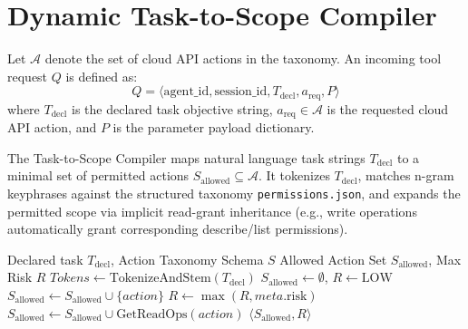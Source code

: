 \documentclass[conference]{IEEEtran}
\begin{document}
\section{Dynamic Task-to-Scope Compiler}\label{sec:compiler}

Let $\mathcal{A}$ denote the set of cloud API actions in the taxonomy. An incoming tool request $Q$ is defined as:
\begin{equation}
Q = \langle \text{agent\_id}, \text{session\_id}, T_{\text{decl}}, a_{\text{req}}, P \rangle
\end{equation}
where $T_{\text{decl}}$ is the declared task objective string, $a_{\text{req}} \in \mathcal{A}$ is the requested cloud API action, and $P$ is the parameter payload dictionary.

The Task-to-Scope Compiler maps natural language task strings $T_{\text{decl}}$ to a minimal set of permitted actions $S_{\text{allowed}} \subseteq \mathcal{A}$. It tokenizes $T_{\text{decl}}$, matches n-gram keyphrases against the structured taxonomy \texttt{permissions.json}, and expands the permitted scope via implicit read-grant inheritance (e.g., write operations automatically grant corresponding describe/list permissions).

\begin{algorithm}[t]
\caption{Task-to-Scope Permission Compilation}
\label{alg:compiler}
\begin{algorithmic}[1]
\REQUIRE Declared task $T_{\text{decl}}$, Action Taxonomy Schema $S$
\ENSURE Allowed Action Set $S_{\text{allowed}}$, Max Risk $R$
\STATE $Tokens \leftarrow \text{TokenizeAndStem}(T_{\text{decl}})$
\STATE $S_{\text{allowed}} \leftarrow \emptyset$, $R \leftarrow \text{LOW}$
                \STATE $S_{\text{allowed}} \leftarrow S_{\text{allowed}} \cup \{action\}$
                \STATE $R \leftarrow \max(R, meta.\text{risk})$
            \ENDIF
        \ENDFOR
    \ENDFOR
\ENDFOR
{}
            \STATE $S_{\text{allowed}} \leftarrow S_{\text{allowed}} \cup \text{GetReadOps}(action)$
        \ENDIF
    \ENDFOR
\ENDIF
\RETURN $\langle S_{\text{allowed}}, R \rangle$
\end{algorithmic}
\end{algorithm}
\end{document}
